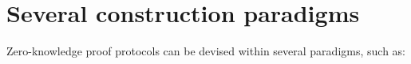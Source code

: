 
% 
% 
% 
% 
% 
% 
% 
% 


\section{Several construction paradigms}
\label{paradigms:others}


Zero-knowledge proof protocols can be devised within several paradigms,%
such as:



